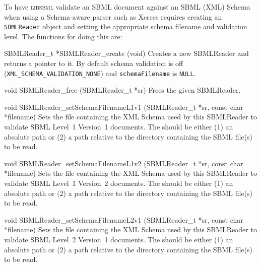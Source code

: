 \documentclass{sbmlmanual}
\newcommand{\libsbml}{\textsc{libsbml}}
\begin{document}
To have \libsbml{} validate an SBML document against an SBML (XML) Schema
when using a Schema-aware parser such as Xerces requires creating an
\texttt{SBMLReader} object and setting the appropriate schema filename and
validation level.  The functions for doing this are:


\begin{methoddef}{SBMLReader\_t *SBMLReader\_create (void)}
  Creates a new SBMLReader and returns a pointer to it.  By default
  schema validation is off (\texttt{XML\_SCHEMA\_VALIDATION\_NONE})
  and \texttt{schemaFilename} is \texttt{NULL}.
\end{methoddef}


\begin{methoddef}{void SBMLReader\_free (SBMLReader\_t *sr)}
  Frees the given SBMLReader.
\end{methoddef}


\begin{methoddef}{void SBMLReader\_setSchemaFilenameL1v1 (SBMLReader\_t *sr, const char *filename)}
  Sets the file containing the XML Schema used by this SBMLReader to
  validate SBML Level~1 Version~1 documents.  The 
  should be either (1) an absolute path or (2) a path relative to the
  directory containing the SBML file(s) to be read.
\end{methoddef}


\begin{methoddef}{void SBMLReader\_setSchemaFilenameL1v2 (SBMLReader\_t *sr, const char *filename)}
  Sets the file containing the XML Schema used by this SBMLReader to
  validate SBML Level~1 Version~2 documents.  The 
  should be either (1) an absolute path or (2) a path relative to the
  directory containing the SBML file(s) to be read.
\end{methoddef}


\begin{methoddef}{void SBMLReader\_setSchemaFilenameL2v1 (SBMLReader\_t *sr, const char *filename)}
  Sets the file containing the XML Schema used by this SBMLReader to
  validate SBML Level~2 Version~1 documents.  The 
  should be either (1) an absolute path or (2) a path relative to the
  directory containing the SBML file(s) to be read.
\end{methoddef}
\end{document}
